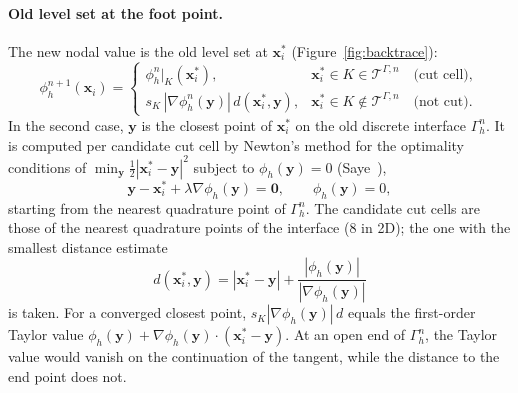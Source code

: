 \documentclass[11pt,a4paper]{article}
\newcommand{\T}{\mathcal{T}}
\newcommand{\x}{\bm{x}}
\newcommand{\y}{\bm{y}}
\begin{document}
\paragraph{Old level set at the foot point.}
The new nodal value is the old level set at $\x_i^*$ (Figure~\ref{fig:backtrace}):
\begin{equation}
\label{eq:sl}
\phi_h^{n+1}(\x_i) =
\begin{cases}
\phi_h^{n}|_K(\x_i^*), & \x_i^* \in K \in \T^{\Gamma,n} \quad \text{(cut cell)},\\[3pt]
s_K\, |\nabla \phi_h^n(\y)|\, d(\x_i^*, \y), & \x_i^* \in K \notin \T^{\Gamma,n} \quad
\text{(not cut)}.
\end{cases}
\end{equation}
In the second case, $\y$ is the closest point of $\x_i^*$ on the old discrete interface
$\Gamma_h^n$. It is computed per candidate cut cell by Newton's method for the optimality conditions
of $\min_{\y} \tfrac12|\x_i^* - \y|^2$ subject to $\phi_h(\y) = 0$ (Saye~\cite{Saye2014}),
\begin{equation}
\y - \x_i^* + \lambda \nabla\phi_h(\y) = \bm{0}, \qquad \phi_h(\y) = 0,
\end{equation}
starting from the nearest quadrature point of $\Gamma_h^n$. The candidate cut cells are those of the
nearest quadrature points of the interface (8 in 2D); the one with the smallest distance estimate
\begin{equation}
d(\x_i^*, \y) = |\x_i^* - \y| + \frac{|\phi_h(\y)|}{|\nabla \phi_h(\y)|}
\end{equation}
is taken. For a converged closest point, $s_K |\nabla\phi_h(\y)|\, d$ equals the first-order Taylor
value $\phi_h(\y) + \nabla\phi_h(\y)\cdot(\x_i^* - \y)$. At an open end of $\Gamma_h^n$, the Taylor
value would vanish on the continuation of the tangent, while the distance to the end point does not.
\end{document}
